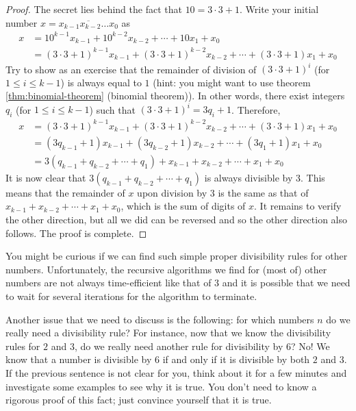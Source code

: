 \documentclass{subfile}
\begin{document}
	\begin{proof}
		The secret lies behind the fact that $10 = 3 \cdot 3 + 1$. Write your initial number $x = \overline{x_{k-1} x_{k-2}\ldots x_0}$ as
			\begin{align*}
				x & = 10^{k-1}x_{k-1} + 10^{k-2}x_{k-2} + \cdots + 10x_1 + x_0\\
				&= (3 \cdot 3 + 1)^{k-1}x_{k-1} + (3 \cdot 3 + 1)^{k-2}x_{k-2} + \cdots + (3 \cdot 3 + 1)x_1 + x_0
			\end{align*}
		Try to show as an exercise that the remainder of division of $(3 \cdot 3 + 1)^{i}$ (for $1 \leq i \leq k-1$) is always equal to $1$ (hint: you might want to use theorem \eqref{thm:binomial-theorem} (binomial theorem)). In other words, there exist integers $q_i$ (for $1 \leq i \leq k-1$) such that $(3 \cdot 3 + 1)^{i} = 3q_i + 1$. Therefore,
			\begin{align*}
				x &= (3 \cdot 3 + 1)^{k-1}x_{k-1} + (3 \cdot 3 + 1)^{k-2}x_{k-2} + \cdots + (3 \cdot 3 + 1)x_1 + x_0\\
				&= (3q_{k-1}+1)x_{k-1} + (3q_{k-2}+1)x_{k-2} + \cdots  + (3q_{1}+1)x_{1} + x_{0}\\
				&= 3(q_{k-1} + q_{k-2} + \cdots + q_1)  + x_{k-1} + x_{k-2} + \cdots + x_1 + x_0
			\end{align*}
		It is now clear that $3(q_{k-1} + q_{k-2} + \cdots + q_1)$ is always divisible by $3$. This means that the remainder of $x$ upon division by $3$ is the same as that of $x_{k-1} + x_{k-2} + \cdots + x_1 + x_0$, which is the sum of digits of $x$. It remains to verify the other direction, but all we did can be reversed and so the other direction also follows. The proof is complete.
	\end{proof}

You might be curious if we can find such simple proper divisibility rules for other numbers. Unfortunately, the recursive algorithms we find for (most of) other numbers are not always time-efficient like that of $3$ and it is possible that we need to wait for several iterations for the algorithm to terminate.

Another issue that we need to discuss is the following: for which numbers $n$ do we really need a divisibility rule? For instance, now that we know the divisibility rules for $2$ and $3$, do we really need another rule for divisibility by $6$? No! We know that a number is divisible by $6$ if and only if it is divisible by both $2$ and $3$. If the previous sentence is not clear for you, think about it for a few minutes and investigate some examples to see why it is true. You don't need to know a rigorous proof of this fact; just convince yourself that it is true.
\end{document}
